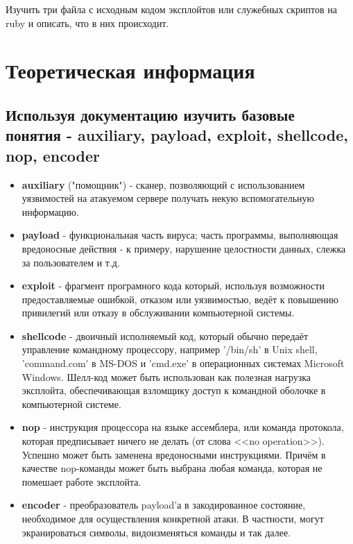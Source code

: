 \documentclass[a4paper]{article}
\begin{document}
Изучить три файла с исходным кодом эксплойтов или служебных скриптов на ruby и описать, что в них происходит.

\section{Теоретическая информация}

\subsection{Используя документацию изучить базовые понятия - auxiliary, payload, exploit, shellcode, nop, encoder}

\begin{itemize}
\item \textbf{auxiliary} ("помощник") - сканер, позволяющий с использованием уязвимостей на атакуемом сервере получать некую вспомогательную информацию.

\item \textbf{payload} - функциональная часть вируса; часть программы, выполняющая вредоносные действия - к примеру, нарушение целостности данных, слежка за пользователем и т.д.

\item \textbf{exploit} - фрагмент програмного кода который, используя возможности предоставляемые ошибкой, отказом или уязвимостью, ведёт к повышению привилегий или отказу в обслуживании компьютерной системы.
			
\item \textbf{shellcode} - двоичный исполняемый код, который обычно передаёт управление командному процессору, например '/bin/sh' в Unix shell, 'command.com' в MS-DOS и 'cmd.exe' в операционных системах Microsoft Windows. Шелл-код может быть использован как полезная нагрузка эксплойта, обеспечивающая взломщику доступ к командной оболочке в компьютерной системе.

\item \textbf{nop} - инструкция процессора на языке ассемблера, или команда протокола, которая предписывает ничего не делать (от слова <<no operation>>). Успешно может быть заменена вредоносными инструкциями. Причём в качестве nop-команды может быть выбрана любая команда, которая не помешает работе эксплойта.
			
\item \textbf{encoder} - преобразователь payload'а в закодированное состояние, необходимое для осуществления конкретной атаки. В частности, могут экранироваться символы, видоизменяться команды и так далее.

\end{itemize}
\end{document}
